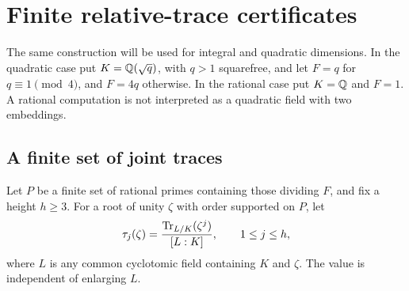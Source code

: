 \section{Finite relative-trace certificates}\label{sec:finite}
The same construction will be used for integral and quadratic dimensions.
In the quadratic case put $K=\mathbb Q(\sqrt q)$, with $q>1$ squarefree, and let
$F=q$ for $q\equiv1\pmod4$, and $F=4q$ otherwise. In the rational case
put $K=\mathbb Q$ and $F=1$. A rational computation is not interpreted as a
quadratic field with two embeddings.

\subsection{A finite set of joint traces}
Let $P$ be a finite set of rational primes containing those dividing $F$,
and fix a height $h\ge3$. For a root of unity $\zeta$ with order supported
on $P$, let
\[
 \tau_j(\zeta)=\frac{\operatorname{Tr}_{L/K}(\zeta^j)}{[L:K]},\qquad 1\le j\le h,
\]
where $L$ is any common cyclotomic field containing $K$ and $\zeta$.
The value is independent of enlarging $L$.

